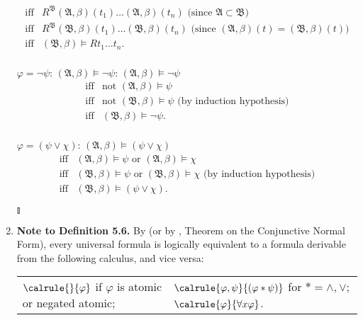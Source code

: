 \begin{enumerate}[1.]
\[\begin{array}{ll}
\mbox{iff} & R^{\mathfrak{B}} ( \mathfrak{A}, \beta )(t_1) \ldots ( \mathfrak{A}, \beta )(t_n) \mbox{ (since $\mathfrak{A} \subset \mathfrak{B}$)} \\
\mbox{iff} & R^{\mathfrak{B}} ( \mathfrak{B}, \beta )(t_1) \ldots ( \mathfrak{B}, \beta )(t_n) \mbox{ (since $( \mathfrak{A}, \beta )(t) = ( \mathfrak{B}, \beta )(t)$)} \\
\mbox{iff} & ( \mathfrak{B}, \beta ) \models Rt_1 \ldots t_n .
\end{array}
\]
\ 
\\$\varphi = \neg \psi$: $( \mathfrak{A}, \beta ) \models \neg \psi$: $( \mathfrak{A}, \beta ) \models \neg \psi$
\[
\begin{array}{ll}
\mbox{iff} & \mbox{not $( \mathfrak{A}, \beta ) \models \psi$}\\
\mbox{iff} & \mbox{not $( \mathfrak{B}, \beta ) \models \psi$ (by induction hypothesis)} \\
\mbox{iff} & ( \mathfrak{B}, \beta ) \models \neg \psi.
\end{array}
\]
\ 
\\$\varphi = ( \psi \lor \chi )$: $( \mathfrak{A}, \beta ) \models ( \psi \lor \chi )$
\[
\begin{array}{ll}
\mbox{iff} & ( \mathfrak{A}, \beta ) \models \psi \mbox{ or } ( \mathfrak{A}, \beta ) \models \chi \\
\mbox{iff} & ( \mathfrak{B}, \beta ) \models \psi \mbox{ or } ( \mathfrak{B}, \beta ) \models \chi \mbox{ (by induction hypothesis)}\\
\mbox{iff} & ( \mathfrak{B}, \beta ) \models ( \psi \lor \chi ).
\end{array}
\] \begin{flushright}$\talloblong$\end{flushright}
%
\item \textbf{Note to Definition 5.6.} By  (or by , Theorem on the Conjunctive Normal Form), every universal formula is logically equivalent to a formula derivable from the following calculus, and vice versa:\medskip\\
\begin{tabular}{ll}
$\calrule{}{\varphi}$ if $\varphi$ is atomic or negated atomic; & $\calrule{\varphi, \psi}{(\varphi \ast \psi)}$ for $\ast = \land, \lor$; \cr
$\calrule{\varphi}{\forall x \varphi}$.
\end{tabular}
%

\end{enumerate}

